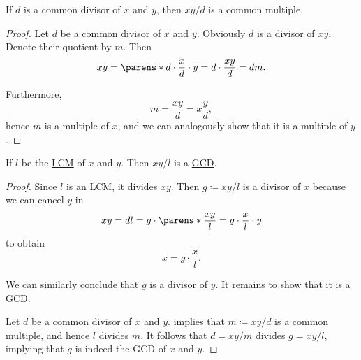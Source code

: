 \begin{lemma}\label{thm:common_divisor_to_multiple_lemma}
  If \( d \) is a common divisor of \( x \) and \( y \), then \( xy / d \) is a common multiple.
\end{lemma}
\begin{proof}
  Let \( d \) be a common divisor of \( x \) and \( y \). Obviously \( d \) is a divisor of \( xy \). Denote their quotient by \( m \). Then
  \begin{equation*}
    xy = \parens*{ d \cdot \frac x d } \cdot y = d \cdot \frac {xy} d = dm.
  \end{equation*}

  Furthermore,
  \begin{equation*}
    m = \frac {xy} d = x \frac y d,
  \end{equation*}
  hence \( m \) is a multiple of \( x \), and we can analogously show that it is a multiple of \( y \).
\end{proof}

\begin{lemma}\label{thm:lcm_to_gcd_lemma}
  If \( l \) be the \hyperref[def:lcm]{LCM} of \( x \) and \( y \). Then \( xy / l \) is a \hyperref[def:gcd]{GCD}.
\end{lemma}
\begin{proof}
  Since \( l \) is an LCM, it divides \( xy \). Then \( g \coloneqq xy / l \) is a divisor of \( x \) because we can cancel \( y \) in
  \begin{equation*}
    xy = dl = g \cdot \parens*{ \frac {xy} l } = g \cdot \frac x l \cdot y
  \end{equation*}
  to obtain
  \begin{equation*}
    x = g \cdot \frac x l.
  \end{equation*}

  We can similarly conclude that \( g \) is a divisor of \( y \). It remains to show that it is a GCD.

  Let \( d \) be a common divisor of \( x \) and \( y \).  implies that \( m \coloneqq xy / d \) is a common multiple, and hence \( l \) divides \( m \). It follows that \( d = xy / m \) divides \( g = xy / l \), implying that \( g \) is indeed the GCD of \( x \) and \( y \).
\end{proof}

